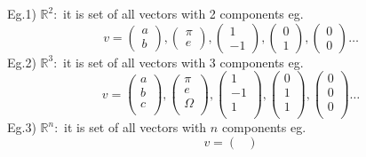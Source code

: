 \documentclass[a4paper,11pt]{article}
\numberwithin{equation}{section}
\begin{document}
\begin{itemize}
    Eg.1) $\mathbb{R}^2 :$ it is set of all vectors with 2 components eg.
    \[v=
    \begin{pmatrix}
        a\\
        b
    \end{pmatrix},
    \begin{pmatrix}
        \pi\\
        e
    \end{pmatrix},
    \begin{pmatrix}
        1\\
        -1
    \end{pmatrix},
    \begin{pmatrix}
        0\\
        1
    \end{pmatrix},
    \begin{pmatrix}
        0\\
        0
    \end{pmatrix} \dots
    \]
    Eg.2) $\mathbb{R}^3 :$ it is set of all vectors with 3 components eg.
    \[v=
    \begin{pmatrix}
        a\\
        b\\
        c\\
    \end{pmatrix},
    \begin{pmatrix}
        \pi\\
        e \\
        \Omega\\
    \end{pmatrix},
    \begin{pmatrix}
        1\\
        -1\\
        1\\
    \end{pmatrix},
    \begin{pmatrix}
        0\\
        1\\
        1\\
    \end{pmatrix},
    \begin{pmatrix}
        0\\
        0\\
        0\\
    \end{pmatrix} \dots
    \]
    Eg.3) $\mathbb{R}^n :$ it is set of all vectors with $n$ components eg.
    \[v=
    \begin{pmatrix}

\end{pmatrix}\]
\end{itemize}
\end{document}
